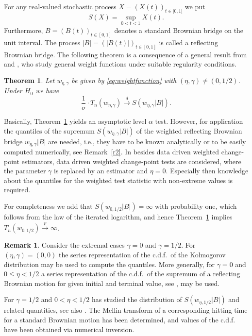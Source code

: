 \documentclass[a4paper]{amsart}
\theoremstyle{definition}
\newtheorem{rem}[exmp]{Remark}
\theoremstyle{plain}
\newtheorem{thm}[exmp]{Theorem}
\newcommand{\dconv}{ \ensuremath{ \overset{d}{\longrightarrow}}}
\newcommand{\pconv}{\ensuremath{ \overset p {\longrightarrow}}}
\begin{document}
For any real-valued stochastic process $X=(X(t))_{t \in {]0,1[}}$
we put
\[
S(X) = \sup_{0 < t < 1} X(t).
\]
Furthermore, $B=(B(t))_{t \in [0,1]}$ denotes a standard Brownian
bridge on the unit interval.
The process $|B| = (|B(t)|)_{t \in [0,1]}$ is called a reflecting
Brownian bridge.
The following theorem is a consequence of a general result
from \citet*{incoll:KirchTadjuidje16} and \citet*{Dis:Schwaar},
who study general weight functions under suitable regularity conditions.

\begin{thm}\label{t2}
Let $w_{\eta,\gamma}$ be given by \eqref{eq:weightfunction}
with $(\eta,\gamma) \neq (0,1/2)$.
Under $H_0$ we have
\[
\frac{1}{\sigma} \cdot T_n(w_{\eta,\gamma})\dconv S(w_{\eta,\gamma} |B|).
\]
\end{thm}

Basically, Theorem~\ref{t2} yields an asymptotic level $\alpha$ test.
However,
for application the quantiles of the supremum $S(w_{\eta,\gamma}|B|)$ of
the weighted reflecting Brownian bridge $w_{\eta,\gamma}|B|$
are needed,
i.e., they have to be known analytically or to be easily
computed numerically, see Remark~\ref{r2}.
In \citet*{Schwaar20} {besides data driven weighted change-point estimators, data driven weighted change-point tests are considered, where the parameter $\gamma$ is replaced by an estimator and $\eta=0$}.
Especially then knowledge
about the quantiles for the weighted test statistic with non-extreme
values is required.

For completeness we add that $S(w_{0,1/2}|B|) = \infty$ with
probability one, which follows from the law of the iterated logarithm,
and hence Theorem~\ref{t2} implies
$T_n(w_{0,1/2}) \pconv \infty$.

\begin{rem}\label{r1}
Consider the extremal cases $\gamma = 0$ and $\gamma = 1/2$.
For $(\eta,\gamma) = (0,0)$ the series representation
of the c.d.f.\ of the Kolmogorov distribution may be used to
compute the quantiles.
More generally, for $\gamma=0$ and $0 \leq \eta < 1/2$
a series representation of the c.d.f.\ of the supremum of
a reflecting Brownian motion for given initial and terminal value,
see \citet*[Eqn.~(3.1.1.1.8)]{borodin_salminen_1996},
may be used.

For $\gamma = 1/2$ and $0 < \eta < 1/2$ \citet*{DeLong81} has
studied the distribution of $S(w_{\eta,1/2}|B|)$ and related
quantities, see also \citet*{MR777516}.
The Mellin transform of a corresponding hitting time for a standard
Brownian motion has been determined, and values of the c.d.f. have been
obtained via numerical inversion.
\end{rem}
\end{document}

